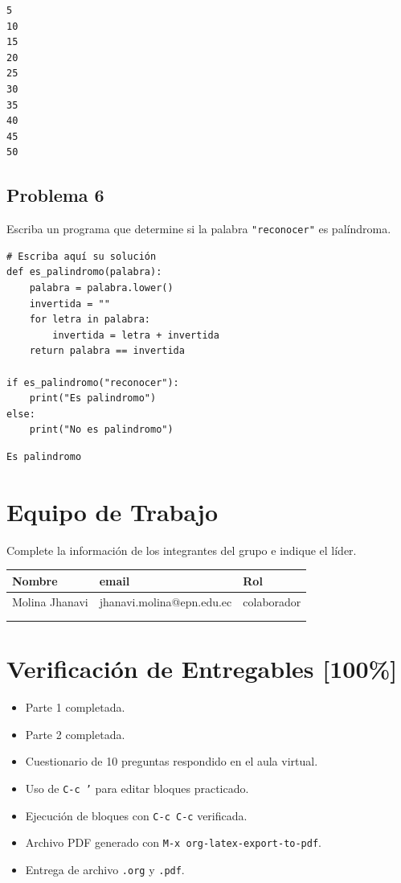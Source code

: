 \documentclass{article}
\begin{document}
\begin{verbatim}
5
10
15
20
25
30
35
40
45
50
\end{verbatim}

\subsection{Problema 6}
\label{sec:orgae33a5d}
Escriba un programa que determine si la palabra \texttt{"reconocer"} es palíndroma.

\begin{verbatim}
# Escriba aquí su solución
def es_palindromo(palabra):
    palabra = palabra.lower()
    invertida = ""
    for letra in palabra:
        invertida = letra + invertida
    return palabra == invertida

if es_palindromo("reconocer"):
    print("Es palindromo")
else:
    print("No es palindromo")
\end{verbatim}

\begin{verbatim}
Es palindromo
\end{verbatim}



\section{Equipo de Trabajo}
\label{sec:orgb2498eb}
Complete la información de los integrantes del grupo e indique el líder.

\begin{center}
\begin{tabular}{lll}
\hline
Nombre & email & Rol\\[0pt]
\hline
Molina Jhanavi & jhanavi.molina@epn.edu.ec & colaborador\\[0pt]
 &  & \\[0pt]
 &  & \\[0pt]
\hline
\end{tabular}
\end{center}

\section{Verificación de Entregables [100\%]}
\label{sec:org72b838f}
\begin{itemize}
\item[{$\boxtimes$}] Parte 1 completada.
\item[{$\boxtimes$}] Parte 2 completada.
\item[{$\boxtimes$}] Cuestionario de 10 preguntas respondido en el aula virtual.
\item[{$\boxtimes$}] Uso de \texttt{C-c '} para editar bloques practicado.
\item[{$\boxtimes$}] Ejecución de bloques con \texttt{C-c C-c} verificada.
\item[{$\boxtimes$}] Archivo PDF generado con \texttt{M-x org-latex-export-to-pdf}.
\item[{$\boxtimes$}] Entrega de archivo \texttt{.org} y \texttt{.pdf}.
\end{itemize}
\end{document}

